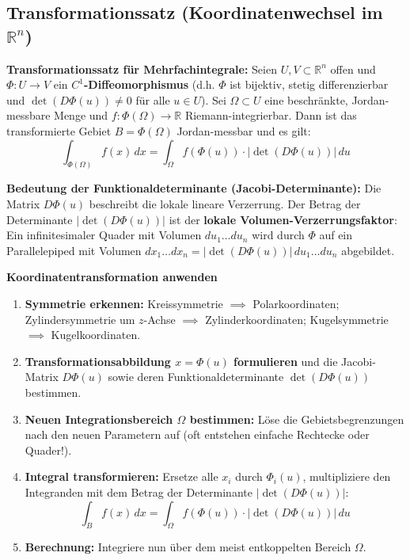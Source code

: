 \subsection{Transformationssatz (Koordinatenwechsel im $\mathbb{R}^n$)}

\begin{theorem}
    \textbf{Transformationssatz für Mehrfachintegrale:}
    Seien $U, V \subset \mathbb{R}^n$ offen und $\Phi: U \to V$ ein \textbf{$C^1$-Diffeomorphismus} (d.h. $\Phi$ ist bijektiv, stetig differenzierbar und $\det(D\Phi(u)) \neq 0$ für alle $u \in U$).
    Sei $\Omega \subset U$ eine beschränkte, Jordan-messbare Menge und $f: \Phi(\Omega) \to \mathbb{R}$ Riemann-integrierbar.
    Dann ist das transformierte Gebiet $B = \Phi(\Omega)$ Jordan-messbar und es gilt:
    $$ \int_{\Phi(\Omega)} f(x) \, dx = \int_\Omega f(\Phi(u)) \cdot \big| \det(D\Phi(u)) \big| \, du $$
\end{theorem}

\begin{remark}
    \textbf{Bedeutung der Funktionaldeterminante (Jacobi-Determinante):}
    Die Matrix $D\Phi(u)$ beschreibt die lokale lineare Verzerrung. Der Betrag der Determinante $|\det(D\Phi(u))|$ ist der \textbf{lokale Volumen-Verzerrungsfaktor}: Ein infinitesimaler Quader mit Volumen $du_1 \dots du_n$ wird durch $\Phi$ auf ein Parallelepiped mit Volumen $dx_1 \dots dx_n = |\det(D\Phi(u))| \, du_1 \dots du_n$ abgebildet.
\end{remark}

\begin{example}
    \textbf{Koordinatentransformation anwenden}
    
    \begin{enumerate}
        \item \textbf{Symmetrie erkennen:} Kreissymmetrie $\implies$ Polarkoordinaten; Zylindersymmetrie um $z$-Achse $\implies$ Zylinderkoordinaten; Kugelsymmetrie $\implies$ Kugelkoordinaten.
        \item \textbf{Transformationsabbildung $x = \Phi(u)$ formulieren} und die Jacobi-Matrix $D\Phi(u)$ sowie deren Funktionaldeterminante $\det(D\Phi(u))$ bestimmen.
        \item \textbf{Neuen Integrationsbereich $\Omega$ bestimmen:}
        Löse die Gebietsbegrenzungen nach den neuen Parametern auf (oft entstehen einfache Rechtecke oder Quader!).
        \item \textbf{Integral transformieren:}
        Ersetze alle $x_i$ durch $\Phi_i(u)$, multipliziere den Integranden mit dem Betrag der Determinante $|\det(D\Phi(u))|$:
        $$ \int_B f(x) \, dx = \int_\Omega f(\Phi(u)) \cdot |\det(D\Phi(u))| \, du $$
        \item \textbf{Berechnung:} Integriere nun über dem meist entkoppelten Bereich $\Omega$.
    \end{enumerate}
\end{example}

